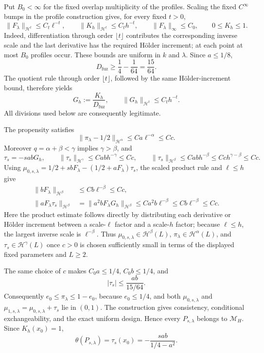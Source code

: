 Put \(B_0<\infty\) for the fixed overlap multiplicity of the profiles.  Scaling the fixed \(C^\infty\) bumps in the profile construction gives, for every fixed \(t>0\),
\[
 \|F_\lambda\|_{\mathcal H^t}\le C_t\ell^{-t},
 \qquad
 \|K_h\|_{\mathcal H^t}\le C_t h^{-t},
 \qquad
 \|F_\lambda\|_\infty\le C_0,
 \qquad 0\le K_h\le1 .
\]
Indeed, differentiation through order \(\lfloor t\rfloor\) contributes the corresponding inverse scale and the last derivative has the required Hölder increment; at each point at most \(B_0\) profiles occur.  These bounds are uniform in \(k\) and \(\lambda\).  Since \(a\le1/8\),
\[
 D_{\mathrm{fuz}}\ge \frac14-\frac1{64}=\frac{15}{64}.
\]
The quotient rule through order \(\lfloor t\rfloor\), followed by the same Hölder-increment bound, therefore yields
\[
 G_h:=\frac{K_h}{D_{\mathrm{fuz}}},
 \qquad
 \|G_h\|_{\mathcal H^t}\le C_t h^{-t}.
\]
All divisions used below are consequently legitimate.

The propensity satisfies
\[
 \|\pi_\lambda-1/2\|_{\mathcal H^\alpha}
 \le C a\ell^{-\alpha}\le Cc.
\]
Moreover \(q=\alpha+\beta<\gamma\) implies \(\gamma>\beta\), and
\[
 \tau_s=-sabG_h,
 \qquad
 \|\tau_s\|_{\mathcal H^\gamma}
 \le C ab h^{-\gamma}\le Cc,
 \qquad
 \|\tau_s\|_{\mathcal H^\beta}
 \le C ab h^{-\beta}\le Cc h^{\gamma-\beta}\le Cc.
\]
Using \(\mu_{0,s,\lambda}=1/2+sbF_\lambda-(1/2+aF_\lambda)\tau_s\), the scaled product rule and \(\ell\le h\) give
\[
 \begin{aligned}
 \|bF_\lambda\|_{\mathcal H^\beta}
   &\le Cb\ell^{-\beta}\le Cc,\\
 \|aF_\lambda\tau_s\|_{\mathcal H^\beta}
   &=\|a^2bF_\lambda G_h\|_{\mathcal H^\beta}
     \le Ca^2b\ell^{-\beta}
     \le Cb\ell^{-\beta}\le Cc.
 \end{aligned}
\]
Here the product estimate follows directly by distributing each derivative or Hölder increment between a scale-\(\ell\) factor and a scale-\(h\) factor; because \(\ell\le h\), the largest inverse scale is \(\ell^{-\beta}\).  Thus \(\mu_{0,s,\lambda}\in\mathcal H^\beta(L)\), \(\pi_\lambda\in\mathcal H^\alpha(L)\), and \(\tau_s\in\mathcal H^\gamma(L)\) once \(c>0\) is chosen sufficiently small in terms of the displayed fixed parameters and \(L\ge2\).

The same choice of \(c\) makes \(C_0a\le1/4\), \(C_0b\le1/4\), and
\[
 |\tau_s|\le \frac{ab}{15/64}.
\]
Consequently \(e_0\le\pi_\lambda\le1-e_0\), because \(e_0\le1/4\), and both \(\mu_{0,s,\lambda}\) and \(\mu_{1,s,\lambda}=\mu_{0,s,\lambda}+\tau_s\) lie in \((0,1)\).  The construction gives consistency, conditional exchangeability, and the exact uniform design.  Hence every \(P_{s,\lambda}\) belongs to \(\mathcal M_H\).  Since \(K_h(x_0)=1\),
\[
 \theta(P_{s,\lambda})=\tau_s(x_0)
 =-\frac{sab}{1/4-a^2}.
\]

